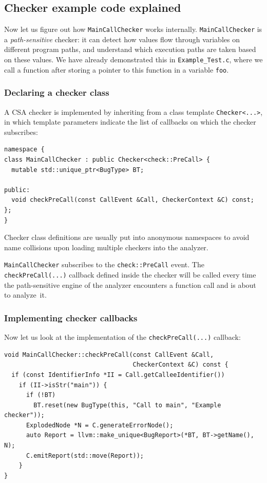 \documentclass[a4paper,12pt]{article}
\newenvironment{nobr}{\begin{minipage}{\textwidth}\setlength\parskip{1em}
}{\end{minipage}\ignorespacesafterend}
\begin{document}
\subsection{Checker example code explained}\label{subsec:coding_intro}

Now let us figure out how \lstinline|MainCallChecker| works internally. \lstinline|MainCallChecker| is a \emph{path-sensitive} check\-er: it can detect how values flow through variables on different program paths, and understand which execution paths are taken based on these values. We have already demonstrated this in \lstinline|Example_Test.c|, where we call a function after storing a pointer to this function in a variable \lstinline|foo|.

\begin{nobr}
\subsubsection{Declaring a checker class}

A CSA checker is implemented by inheriting from a class template \lstinline|Checker<...>|, in which template parameters indicate the list of callbacks on which the checker subscribes:

\begin{lstlisting}[style=cplusplus,firstnumber=10]
namespace {
class MainCallChecker : public Checker<check::PreCall> {
  mutable std::unique_ptr<BugType> BT;

public:
  void checkPreCall(const CallEvent &Call, CheckerContext &C) const;
};
}
\end{lstlisting}
\end{nobr}

Checker class definitions are usually put into anonymous namespaces to avoid name collisions upon loading multiple checkers into the analyzer.

\lstinline|MainCallChecker| subscribes to the \lstinline|check::PreCall| event. The \lstinline|checkPreCall(...)| callback defined inside the checker will be called every time the path-sensitive engine of the analyzer encounters a function call and is about to analyze~it.

\begin{nobr}
\subsubsection{Implementing checker callbacks}

Now let us look at the implementation of the \lstinline|checkPreCall(...)| callback:
\begin{lstlisting}[style=cplusplus,firstnumber=19]
void MainCallChecker::checkPreCall(const CallEvent &Call,
                                   CheckerContext &C) const {
  if (const IdentifierInfo *II = Call.getCalleeIdentifier())
    if (II->isStr("main")) {
      if (!BT)
        BT.reset(new BugType(this, "Call to main", "Example checker"));
      ExplodedNode *N = C.generateErrorNode();
      auto Report = llvm::make_unique<BugReport>(*BT, BT->getName(), N);
      C.emitReport(std::move(Report));
    }
}
\end{lstlisting}
\end{nobr}
\end{document}

